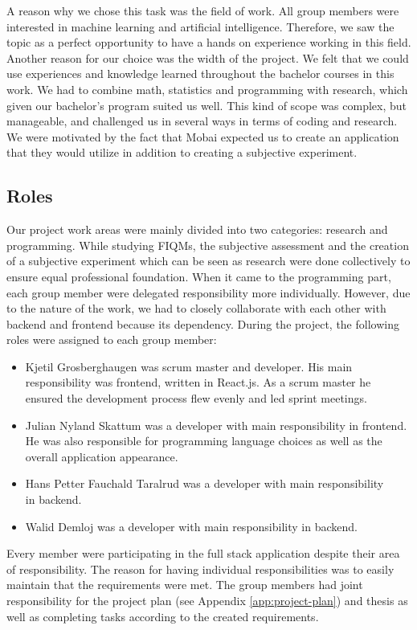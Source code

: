 A reason why we chose this task was the field of work. All group members were interested in machine learning and artificial intelligence. Therefore, we saw the topic as a perfect opportunity to have a hands on experience working in this field. Another reason for our choice was the width of the project. We felt that we could use experiences and knowledge learned throughout the bachelor courses in this work. We had to combine math, statistics and programming with research, which given our bachelor's program suited us well. This kind of scope was complex, but manageable, and challenged us in several ways in terms of coding and research. We were motivated by the fact that Mobai expected us to create an application that they would utilize in addition to creating a subjective experiment.   

\subsection{Roles}
\label{subsec:roles}
Our project work areas were mainly divided into two categories: research and programming. While studying FIQMs, the subjective assessment and the creation of a subjective experiment which can be seen as research were done collectively to ensure equal professional foundation. When it came to the programming part, each group member were delegated responsibility more individually. However, due to the nature of the work, we had to closely collaborate with each other with backend and frontend because its dependency. During the project, the following roles were assigned to each group member:
\begin{itemize}
    \item Kjetil Grosberghaugen was scrum master and developer. His main responsibility was frontend, written in React.js. As a scrum master he ensured the development process flew evenly and led sprint meetings.
    \item Julian Nyland Skattum was a developer with main responsibility in frontend. He was also responsible for programming language choices as well as the overall application appearance. 
    \item Hans Petter Fauchald Taralrud was a developer with main responsibility\\ in backend. 
    \item Walid Demloj was a developer with main responsibility in backend. 
\end{itemize}

Every member were participating in the full stack application despite their area of responsibility. The reason for having individual responsibilities was to easily maintain that the requirements were met. The group members had joint responsibility for the project plan (see Appendix \ref{app:project-plan}) and thesis as well as completing tasks according to the created requirements. 

